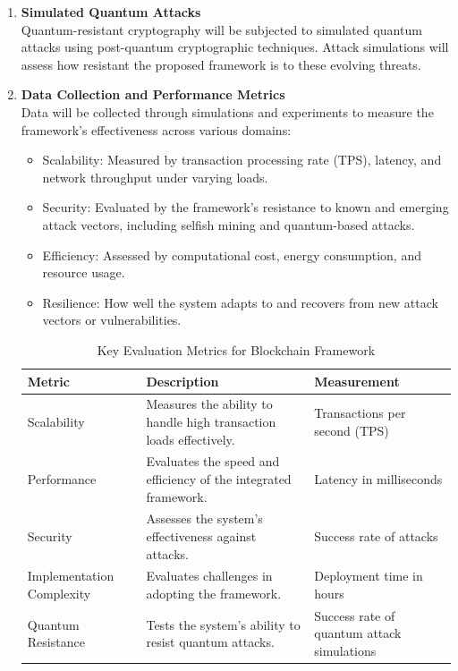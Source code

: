 \documentclass[a4paper, 12pt]{article}
\begin{document}
\begin{enumerate}
\item \textbf{Simulated Quantum Attacks}
\\
Quantum-resistant cryptography will be subjected to simulated quantum attacks using post-quantum cryptographic techniques. Attack simulations will assess how resistant the proposed framework is to these evolving threats.

\item \textbf{Data Collection and Performance Metrics}
\\
Data will be collected through simulations and experiments to measure the framework’s effectiveness across various domains:
\begin{itemize}
    \item Scalability: Measured by transaction processing rate (TPS), latency, and network throughput under varying loads.
    \item Security: Evaluated by the framework’s resistance to known and emerging attack vectors, including selfish mining and quantum-based attacks.
    \item Efficiency: Assessed by computational cost, energy consumption, and resource usage.
    \item Resilience: How well the system adapts to and recovers from new attack vectors or vulnerabilities.
\end{itemize}

\begin{table}[htbp]
    \centering
    \begin{tabular}{|p{3cm}|p{8cm}|p{5cm}|}
        \hline
        \textbf{Metric} & \textbf{Description} & \textbf{Measurement} \\ \hline
        Scalability & Measures the ability to handle high transaction loads effectively. & Transactions per second (TPS) \\ \hline
        Performance & Evaluates the speed and efficiency of the integrated framework. & Latency in milliseconds \\ \hline
        Security & Assesses the system's effectiveness against attacks. & Success rate of attacks \\ \hline
        Implementation Complexity & Evaluates challenges in adopting the framework. & Deployment time in hours \\ \hline
        Quantum Resistance & Tests the system's ability to resist quantum attacks. & Success rate of quantum attack simulations \\ \hline
    \end{tabular}
    \label{tab:evaluation_metrics}
    \caption{Key Evaluation Metrics for Blockchain Framework}
\end{table}


\end{enumerate}
\end{document}
